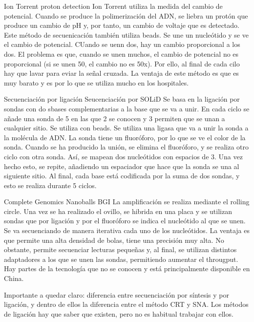 Ion Torrent proton detection
Ion Torrent utiliza la medida del cambio de potencial. Cuando se produce la polimerización del ADN, se liebra un protón que produce un cambio de pH y, por tanto, un cambio de voltaje que es detectado. Este método de secuenicación también utiliza beads. Se une un nucleótido y se ve el cambio de potencial. CUando se uenn dos, hay un cambio proporcional a los dos. El problema es que, cuando se unen muchos, el cambio de potencial no es proporcional (si se unen 50, el cambio no es 50x). Por ello, al final de cada cilo hay que lavar para eviar la señal cruzada. 
La ventaja de este método es que es muy barato y es por lo que se utiliza mucho en los hospitales. 

Secuenciación por ligación
Seucenciación por SOLiD
Se basa en la ligación por sondas con do sbases complementarias a la base que se va a unir. En cada ciclo se añade una sonda de 5 en las que 2 se conocen y 3 permiten que se unan a cualquier sitio. Se utiliza con beads. Se utiliza una ligasa que va a unir la sonda a la molécula de ADN. La sonda tiene un fluoróforo, por lo que se ve el color de la sonda. Cuando se ha producido la unión, se elimina el fluoróforo, y se realiza otro ciclo con otra sonda. Así, se mapean dos nucleótidos con espacios de 3. Una vez hecho esto, se repite, añadiendo un espaciador que hace que la sonda se una al siguiente sitio. Al final, cada base está codificada por la suma de dos sondas, y esto se realiza durante 5 ciclos.

Complete Genomics Nanoballs BGI
La amplificación se realiza mediante el rolling circle. Una vez se ha realizado el ovillo, se hibrida en una placa y se utilizan sondas que por ligación y por el fluoróforo se indica el nucleótido al que se unen. Se va secuenciando de manera iterativa cada uno de los nucleótidos. La ventaja es que permite una alta densidad de bolas, tiene una precisión muy alta. No obstante, permite secuenciar lecturas pequeñas y, al final, se utilizan distintos adaptadores a los que se unen las sondas, permitiendo aumentar el througput. Hay partes de la tecnología que no se conocen y está principalmente disponible en China.

Importante a quedar claro: diferencia entre secuenciación por síntesis y por ligación, y dentro de ellos la diferencia entre el método CRT y SNA. Los métodos de ligación hay que saber que existen, pero no es habitual trabajar con ellos. 

